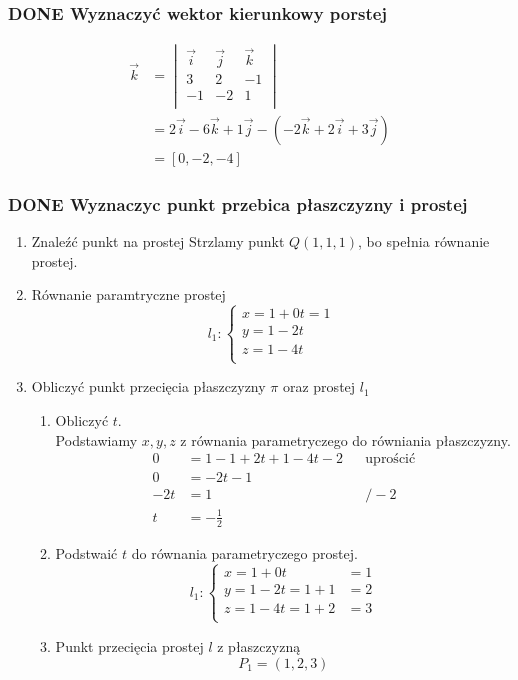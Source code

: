 \documentclass[11pt]{article}
\begin{document}
\subsubsection{{\bfseries\sffamily DONE} Wyznaczyć wektor kierunkowy porstej}
\label{sec:org48ed66f}
\begin{align*}
  \vec k &= \begin{vmatrix}
              \vec i & \vec j & \vec k\\
              3 & 2 & -1 \\
              -1 & -2 & 1\\
            \end{vmatrix}
  \\
         &= 2 \vec i - 6 \vec k + 1 \vec j - (-2 \vec k + 2 \vec i + 3 \vec j)
  \\
         &= [0, -2, -4]
\end{align*}
\subsubsection{{\bfseries\sffamily DONE} Wyznaczyc punkt przebica płaszczyzny i prostej}
\label{sec:orgfc545ad}
\begin{enumerate}
\item Znaleźć punkt na prostej
\label{sec:orgd7e6e63}
Strzlamy punkt \(Q(1,1,1)\), bo spełnia równanie prostej.
\item Równanie paramtryczne prostej
\label{sec:org419f0d4}
\[l_1 : \begin{cases}
        x = 1 + 0t = 1\\
        y = 1 - 2t \\
        z = 1 - 4t\\
\end{cases}\]
\item Obliczyć punkt przecięcia płaszczyzny \(\pi\) oraz prostej \(l_1\)
\label{sec:org39aa8bc}
\begin{enumerate}
\item Obliczyć \(t\).
\label{sec:org05a02e8}
\\\empty
Podstawiamy \(x, y, z\) z równania parametryczego do równiania płaszczyzny.
\begin{align*}
  0 &= 1 - 1 + 2t + 1 - 4t -2 && \text{uprościć}
  \\
  0 &= -2t -1
  \\
  -2t &= 1 && / -2
  \\
  t &= - \frac{1}{2}
\end{align*}
\item Podstwaić \(t\) do równania parametryczego prostej.
\label{sec:org941fd56}
\[l_1 : \begin{cases}
        x = 1 + 0t &= 1\\
        y = 1 - 2t = 1 + 1 &= 2 \\
        z = 1 - 4t = 1 + 2 &= 3\\
\end{cases}\]
\item Punkt przecięcia prostej \(l\) z płaszczyzną
\label{sec:org75a52af}
\[P_1 = (1, 2, 3)\]
\end{enumerate}
\end{enumerate}
\end{document}
